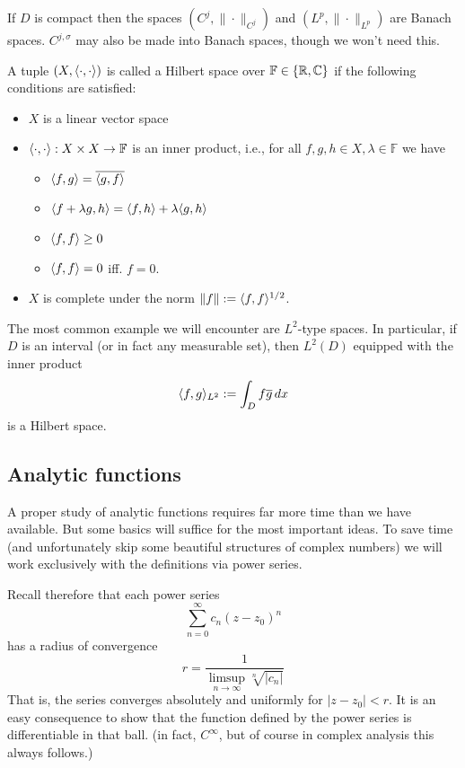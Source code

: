 If $D$ is compact then the spaces $(C^j, \|\cdot\|_{C^j})$ and
$(L^p, \|\cdot\|_{L^p})$ are Banach spaces. $C^{j,\sigma}$ may also be made
into Banach spaces, though we won't need this.

A tuple $(X, \langle\cdot, \cdot\rangle)$ is called a Hilbert space over $\mathbb{F} \in
\{\mathbb{R}, \mathbb{C}\}$ if the following conditions are satisfied:
\begin{itemize}
  \item $X$ is a linear vector space
  \item $\langle\cdot, \cdot\rangle : X \times X \to \mathbb{F}$ is an inner product, i.e.,
  for all $f, g, h \in X, \lambda \in \mathbb{F}$ we have
  \begin{itemize}
      \item $\langle f, g\rangle = \overline{\langle g, f\rangle}$
      \item $\langle f + \lambda g, h \rangle = \langle f, h \rangle + \lambda \langle g, h \rangle$
      \item $\langle f, f \rangle \geq 0$
      \item $\langle f,f \rangle = 0$ iff. $f = 0$.
  \end{itemize}
  \item $X$ is complete under the norm $\|f\| := \langle f,f\rangle^{1/2}$.
\end{itemize}

The most common example we will encounter are $L^2$-type spaces. In particular,
if $D$ is an interval (or in fact any measurable set), then $L^2(D)$ equipped
with the inner product
\[
  \langle f, g \rangle_{L^2} := \int_D f \overline{g} \,dx
\]
is a Hilbert space.



\subsection{Analytic functions}
%
A proper study of analytic functions requires far more time than we have
available. But some basics will suffice for the most important ideas.
To save time (and unfortunately skip some beautiful structures of
complex numbers) we will work exclusively with the definitions via power
series.

Recall therefore that each power series
\[
    \sum_{n = 0}^\infty c_n (z - z_0)^n
\]
has a radius of convergence
\[
    r = \frac{1}{\limsup_{n \to \infty} \sqrt[n]{|c_n|}}
\]
That is, the series converges absolutely and uniformly for $|z - z_0| < r$. It is an easy consequence to show that the function defined by the power series is differentiable in that ball. (in fact, $C^\infty$, but of course in complex analysis this always follows.)

